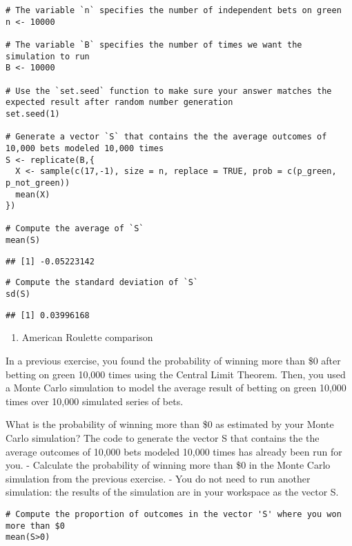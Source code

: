 \documentclass[
]{article}
\providecommand{\tightlist}{%
  \setlength{\itemsep}{0pt}\setlength{\parskip}{0pt}}
\begin{document}
\begin{verbatim}
# The variable `n` specifies the number of independent bets on green
n <- 10000

# The variable `B` specifies the number of times we want the simulation to run
B <- 10000

# Use the `set.seed` function to make sure your answer matches the expected result after random number generation
set.seed(1)

# Generate a vector `S` that contains the the average outcomes of 10,000 bets modeled 10,000 times
S <- replicate(B,{  
  X <- sample(c(17,-1), size = n, replace = TRUE, prob = c(p_green, p_not_green))
  mean(X)
})

# Compute the average of `S`
mean(S)
\end{verbatim}

\begin{verbatim}
## [1] -0.05223142
\end{verbatim}

\begin{verbatim}
# Compute the standard deviation of `S`
sd(S)
\end{verbatim}

\begin{verbatim}
## [1] 0.03996168
\end{verbatim}

\begin{enumerate}
\def\labelenumi{\arabic{enumi}.}
\setcounter{enumi}{9}
\tightlist
\item
  American Roulette comparison
\end{enumerate}

In a previous exercise, you found the probability of winning more than
\$0 after betting on green 10,000 times using the Central Limit Theorem.
Then, you used a Monte Carlo simulation to model the average result of
betting on green 10,000 times over 10,000 simulated series of bets.

What is the probability of winning more than \$0 as estimated by your
Monte Carlo simulation? The code to generate the vector S that contains
the the average outcomes of 10,000 bets modeled 10,000 times has already
been run for you. - Calculate the probability of winning more than \$0
in the Monte Carlo simulation from the previous exercise. - You do not
need to run another simulation: the results of the simulation are in
your workspace as the vector S.

\begin{verbatim}
# Compute the proportion of outcomes in the vector 'S' where you won more than $0
mean(S>0)
\end{verbatim}
\end{document}
